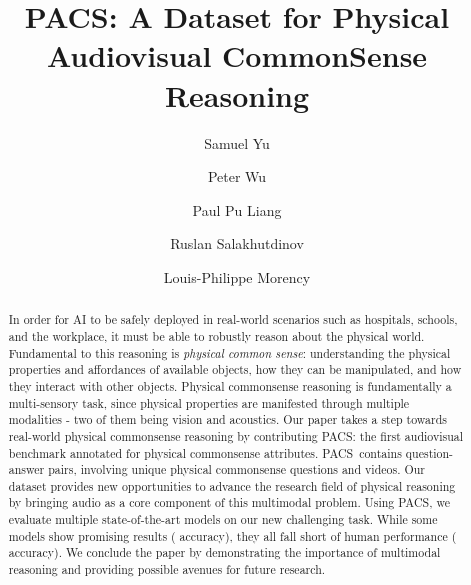 \documentclass[runningheads]{llncs}
\newcommand{\names}{\textsc{PACS}}
\begin{document}
\pagestyle{headings}
\mainmatter
\def\ECCVSubNumber{5310}  

\title{\names: A Dataset for Physical Audiovisual CommonSense Reasoning}

\author{Samuel Yu\and
Peter Wu \and
Paul Pu Liang \and
Ruslan Salakhutdinov \and
Louis-Philippe Morency}



\maketitle


\begin{abstract}
In order for AI to be safely deployed in real-world scenarios such as hospitals, schools, and the workplace, it must be able to robustly reason about the physical world. Fundamental to this reasoning is \textit{physical common sense}: understanding the physical properties and affordances of available objects, how they can be manipulated, and how they interact with other objects. Physical commonsense reasoning is fundamentally a multi-sensory task, since physical properties are manifested through multiple modalities - two of them being vision and acoustics. Our paper takes a step towards real-world physical commonsense reasoning by contributing \names: the first audiovisual benchmark annotated for physical commonsense attributes. \names\ contains  question-answer pairs, involving  unique physical commonsense questions and  videos.
Our dataset provides new opportunities to advance the research field of physical reasoning by bringing audio as a core component of this multimodal problem.
Using \names, we evaluate multiple state-of-the-art models on our new challenging task. While some models show promising results ( accuracy), they all fall short of human performance ( accuracy). We conclude the paper by demonstrating the importance of multimodal reasoning and providing possible avenues for future research.


\end{abstract}
\end{document}
